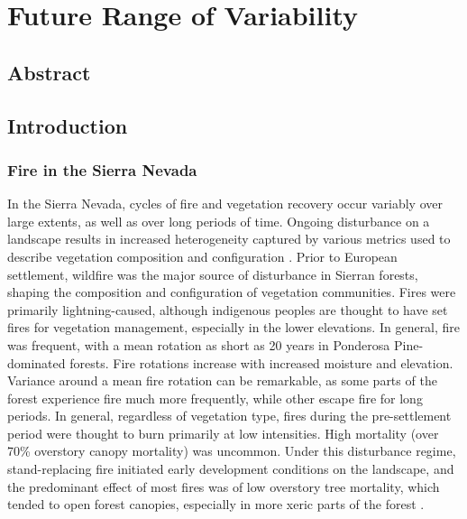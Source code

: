 
\chapter{Future Range of Variability}
\label{ch:FRV}

\section{Abstract}

\section{Introduction}

\subsection{Fire in the Sierra Nevada}
In the Sierra Nevada, cycles of fire and vegetation recovery occur variably over large extents, as well as over long periods of time. Ongoing disturbance on a landscape results in increased heterogeneity captured by various metrics used to describe vegetation composition and configuration \citep{Monica2008}. Prior to European settlement, wildfire was the major source of disturbance in Sierran forests, shaping the composition and configuration of vegetation communities. Fires were primarily lightning-caused, although indigenous peoples are thought to have set fires for vegetation management, especially in the lower elevations. In general, fire was frequent, with a mean rotation as short as 20 years in Ponderosa Pine-dominated forests. Fire rotations increase with increased moisture and elevation. Variance around a mean fire rotation can be remarkable, as some parts of the forest experience fire much more frequently, while other escape fire for long periods. In general, regardless of vegetation type, fires during the pre-settlement period were thought to burn primarily at low intensities. High mortality (over 70\% overstory canopy mortality) was uncommon. Under this disturbance regime, stand-replacing fire initiated early development conditions on the landscape, and the predominant effect of most fires was of low overstory tree mortality, which tended to open forest canopies, especially in more xeric parts of the forest \citep{Mallek2013,Safford2014,SNEP1996,SNEP1996a}. 


